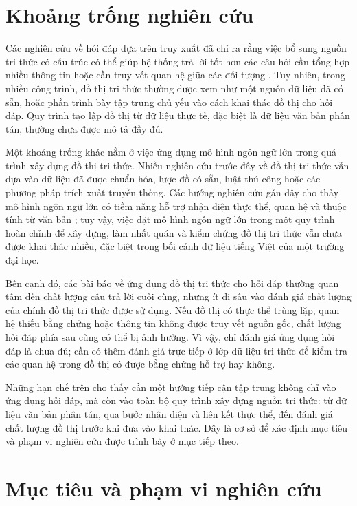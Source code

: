 \section{Khoảng trống nghiên cứu}

Các nghiên cứu về hỏi đáp dựa trên truy xuất đã chỉ ra rằng việc bổ sung nguồn tri thức có cấu trúc có thể giúp hệ thống trả lời tốt hơn các câu hỏi cần tổng hợp nhiều thông tin hoặc cần truy vết quan hệ giữa các đối tượng \cite{lewis2020retrieval,gao2023retrieval,edge2024local}. Tuy nhiên, trong nhiều công trình, đồ thị tri thức thường được xem như một nguồn dữ liệu đã có sẵn, hoặc phần trình bày tập trung chủ yếu vào cách khai thác đồ thị cho hỏi đáp. Quy trình tạo lập đồ thị từ dữ liệu thực tế, đặc biệt là dữ liệu văn bản phân tán, thường chưa được mô tả đầy đủ.

Một khoảng trống khác nằm ở việc ứng dụng mô hình ngôn ngữ lớn trong quá trình xây dựng đồ thị tri thức. Nhiều nghiên cứu trước đây về đồ thị tri thức vẫn dựa vào dữ liệu đã được chuẩn hóa, lược đồ có sẵn, luật thủ công hoặc các phương pháp trích xuất truyền thống. Các hướng nghiên cứu gần đây cho thấy mô hình ngôn ngữ lớn có tiềm năng hỗ trợ nhận diện thực thể, quan hệ và thuộc tính từ văn bản \cite{pan2024unifying,zhang2024extract,parovic2025generating}; tuy vậy, việc đặt mô hình ngôn ngữ lớn trong một quy trình hoàn chỉnh để xây dựng, làm nhất quán và kiểm chứng đồ thị tri thức vẫn chưa được khai thác nhiều, đặc biệt trong bối cảnh dữ liệu tiếng Việt của một trường đại học.

Bên cạnh đó, các bài báo về ứng dụng đồ thị tri thức cho hỏi đáp thường quan tâm đến chất lượng câu trả lời cuối cùng, nhưng ít đi sâu vào đánh giá chất lượng của chính đồ thị tri thức được sử dụng. Nếu đồ thị có thực thể trùng lặp, quan hệ thiếu bằng chứng hoặc thông tin không được truy vết nguồn gốc, chất lượng hỏi đáp phía sau cũng có thể bị ảnh hưởng. Vì vậy, chỉ đánh giá ứng dụng hỏi đáp là chưa đủ; cần có thêm đánh giá trực tiếp ở lớp dữ liệu tri thức để kiểm tra các quan hệ trong đồ thị có được bằng chứng hỗ trợ hay không.

Những hạn chế trên cho thấy cần một hướng tiếp cận tập trung không chỉ vào ứng dụng hỏi đáp, mà còn vào toàn bộ quy trình xây dựng nguồn tri thức: từ dữ liệu văn bản phân tán, qua bước nhận diện và liên kết thực thể, đến đánh giá chất lượng đồ thị trước khi đưa vào khai thác. Đây là cơ sở để xác định mục tiêu và phạm vi nghiên cứu được trình bày ở mục tiếp theo.

\section{Mục tiêu và phạm vi nghiên cứu}

